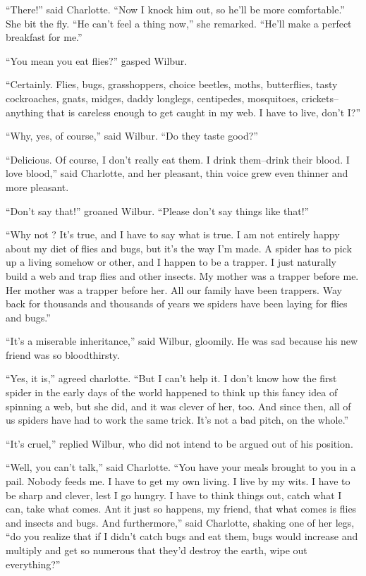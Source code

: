 \documentclass[a4paper, oneside]{book}
\begin{document}
 ``There!'' said Charlotte. ``Now I knock him out, so he'll be more
comfortable.'' She bit the fly. ``He can't feel a thing now,'' she
remarked. ``He'll make a perfect breakfast for me.''

 ``You mean you eat flies?'' gasped Wilbur.

 ``Certainly. Flies, bugs, grasshoppers, choice beetles, moths,
butterflies, tasty cockroaches, gnats, midges, daddy longlegs,
centipedes, mosquitoes, crickets--anything that is careless enough
to get caught in my web. I have to live, don't I?''

``Why, yes, of course,'' said Wilbur. ``Do they taste good?''

 ``Delicious. Of course, I don't really eat them. I drink them--drink
their blood. I love blood,'' said Charlotte, and her pleasant, thin
voice grew even thinner and more pleasant.

 ``Don't say that!'' groaned Wilbur. ``Please don't say things like
that!'' 

 ``Why not ? It's true, and I have to say what is true. I am not
entirely happy about my diet of flies and bugs, but it's the way I'm
made. A spider has to pick up a living somehow or other, and I
happen to be a trapper. I just naturally build a web and trap flies
and other insects. My mother was a trapper before me. Her mother
was a trapper before her. All our family have been trappers. Way
back for thousands and thousands of years we spiders have been
laying for flies and bugs.''

 ``It's a miserable inheritance,'' said Wilbur, gloomily. He was sad
because his new friend was so bloodthirsty. 

 ``Yes, it is,'' agreed charlotte. ``But I can't help it. I don't know how
the first spider in the early days of the world happened to think up
this fancy idea of spinning a web, but she did, and it was clever of
her, too. And since then, all of us spiders have had to work the
same trick. It's not a bad pitch, on the whole.''

 ``It's cruel,'' replied Wilbur, who did not intend to be argued out of
his position.

 ``Well, you can't talk,'' said Charlotte. ``You have your meals
brought to you in a pail. Nobody feeds me. I have to get my own
living. I live by my wits. I have to be sharp and clever, lest I go
hungry. I have to think things out, catch what I can, take what
comes. Ant it just so happens, my friend, that what comes is flies 
and insects and bugs. And furthermore,'' said Charlotte, shaking
one of her legs, ``do you realize that if I didn't catch bugs and eat
them, bugs would increase and multiply and get so numerous that
they'd destroy the earth, wipe out everything?'' 
\end{document}
